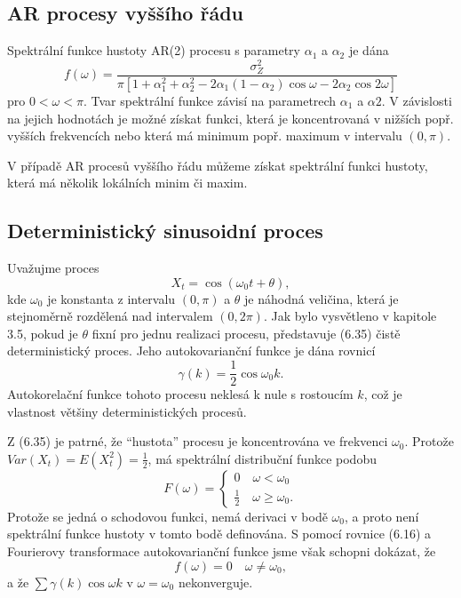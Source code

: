 \subsection{AR procesy vyššího řádu}

Spektrální funkce hustoty AR(2) procesu s parametry $\alpha_1$ a $\alpha_2$ je dána
\begin{equation}
f(\omega) = \frac{\sigma_Z^2}{\pi[1 + \alpha_1^2 + \alpha_2^2 - 2 \alpha_1(1 - \alpha_2) \cos \omega - 2 \alpha_2 \cos 2 \omega]}
\end{equation}
pro $0 < \omega < \pi$. Tvar spektrální funkce závisí na parametrech $\alpha_1$ a $\alpha2$. V závislosti na jejich hodnotách je možné získat funkci, která je koncentrovaná v nižších popř. vyšších frekvencích nebo která má minimum popř. maximum v intervalu $(0, \pi)$.

V případě AR procesů vyššího řádu můžeme získat spektrální funkci hustoty, která má několik lokálních minim či maxim.

\subsection{Deterministický sinusoidní proces}

Uvažujme proces
\begin{equation}
X_t = \cos(\omega_0 t + \theta),
\end{equation}
kde $\omega_0$ je konstanta z intervalu $(0, \pi)$ a $\theta$ je náhodná veličina, která je stejnoměrně rozdělená nad intervalem $(0, 2 \pi)$. Jak bylo vysvětleno v kapitole 3.5, pokud je $\theta$ fixní pro jednu realizaci procesu, představuje (6.35) čistě deterministický proces. Jeho autokovarianční funkce je dána rovnicí
\begin{equation}
\gamma(k) = \frac{1}{2}\cos \omega_0 k.
\end{equation}
Autokorelační funkce tohoto procesu neklesá k nule s rostoucím $k$, což je vlastnost většiny deterministických procesů.

Z (6.35) je patrné, že ``hustota'' procesu je koncentrována ve frekvenci $\omega_0$. Protože $Var(X_t) = E(X_t^2) = \frac{1}{2}$, má spektrální distribuční funkce podobu
\begin{equation}
F(\omega) =
\begin{cases}
0 \quad \omega < \omega_0\\
\frac{1}{2} \quad \omega \ge \omega_0.
\end{cases}
\end{equation}
Protože se jedná o schodovou funkci, nemá derivaci v bodě $\omega_0$, a proto není spektrální funkce hustoty v tomto bodě definována. S pomocí rovnice (6.16) a Fourierovy transformace autokovarianční funkce jsme však schopni dokázat, že
\begin{equation}
f(\omega) = 0 \quad \omega \ne \omega_0,
\end{equation}
a že $\sum \gamma(k) \cos \omega k$ v $\omega = \omega_0$ nekonverguje.

